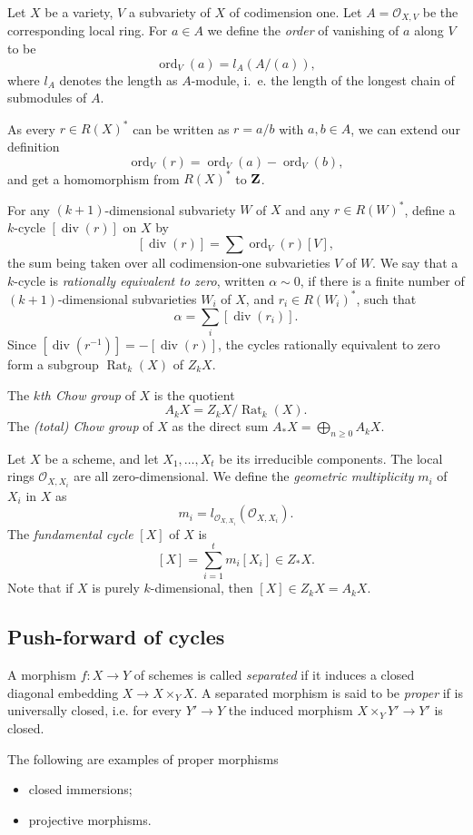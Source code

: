 \documentclass[a4paper,openany]{scrbook}
\DeclareMathOperator{\Rat}{Rat}
\DeclareMathOperator{\ord}{ord}
\DeclareMathOperator{\divisor}{div}
\begin{document}
Let $X$ be a variety, $V$ a subvariety of $X$ of codimension one. Let $A=\mathcal O_{X,V}$ be the corresponding local ring. For $a\in A$ we define the \emph{order} of vanishing of $a$ along $V$ to be
\[
\ord_V(a)=l_A(A/(a)),
\]
where $l_A$ denotes the length as $A$-module, i.~e. the length of the longest chain of submodules of $A$.

As every $r\in R(X)^*$ can be written as $r=a/b$ with $a,b\in A$, we can extend our definition
\[\ord_V(r)=\ord_V(a)-\ord_V(b),\]
and get a homomorphism from $R(X)^*$ to $\mathbf Z$.

For any $(k+1)$-dimensional subvariety $W$ of $X$ and any $r\in R(W)^*$, define a $k$-cycle $[\divisor(r)]$ on $X$ by
\[
[\divisor(r)]=\sum \ord_V(r)[V],
\]
the sum being taken over all codimension-one subvarieties $V$ of $W$. We say that a $k$-cycle is \emph{rationally equivalent to zero}, written $\alpha \sim 0$, if there is a finite number of $(k+1)$-dimensional subvarieties $W_i$ of $X$, and $r_i\in R(W_i)^*$, such that
\[\alpha = \sum_i[\divisor(r_i)].\]
Since $[\divisor(r^{-1})]=-[\divisor(r)]$, the cycles rationally equivalent to zero form a subgroup $\Rat_k(X)$ of $Z_kX$.

\begin{defn}
The \emph{$k$th Chow group} of $X$ is the quotient
\[
A_k X=Z_k X/\Rat_k(X).
\]
The \emph{(total) Chow group} of $X$ as the direct sum $A_*X=\bigoplus_{n\geq 0} A_kX$.
\end{defn}


Let $X$ be a scheme, and let $X_1,\ldots,X_t$ be its irreducible components. The local rings $\mathcal O_{X,X_i}$ are all zero-dimensional. We define the \emph{geometric multiplicity} $m_i$ of $X_i$ in $X$ as 
\[m_i=l_{\mathcal O_{X,X_i}}(\mathcal O_{X,X_i}).\]
The \emph{fundamental cycle} $[X]$ of $X$ is
\[[X]=\sum_{i=1}^t m_i[X_i] \in Z_*X.\]
Note that if $X$ is purely $k$-dimensional, then $[X]\in Z_kX=A_kX$.

\subsection{Push-forward of cycles}

A morphism $f\colon X\to Y$ of schemes is called \emph{separated} if it induces a closed diagonal embedding $X\to X\times_Y X$. A separated morphism is said to be \emph{proper} if is universally closed, i.e. for every $Y'\to Y$ the induced morphism $X\times_Y Y' \to Y'$ is closed.

\begin{example}
The following are examples of proper morphisms 
 \begin{itemize}
  \item closed immersions;
  \item projective morphisms.
 \end{itemize}
\end{example}
\end{document}
